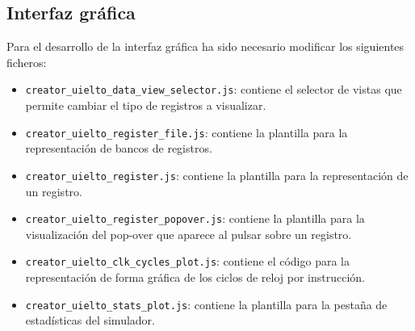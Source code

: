 
\subsection{Interfaz gráfica}\label{subsec:gui}

Para el desarrollo de la interfaz gráfica ha sido necesario modificar los siguientes ficheros:
\begin{itemize}
    \item \texttt{creator\_uielto\_data\_view\_selector.js}: contiene el selector de vistas que permite cambiar el tipo de registros a visualizar.
    \item \texttt{creator\_uielto\_register\_file.js}: contiene la plantilla para la representación de bancos de registros.
    \item \texttt{creator\_uielto\_register.js}: contiene la plantilla para la representación de un registro.
    \item \texttt{creator\_uielto\_register\_popover.js}: contiene la plantilla para la visualización del pop-over que aparece al pulsar sobre un registro.
    \item \texttt{creator\_uielto\_clk\_cycles\_plot.js}: contiene el código para la representación de forma gráfica de los ciclos de reloj por instrucción.
    \item \texttt{creator\_uielto\_stats\_plot.js}: contiene la plantilla para la pestaña de estadísticas del simulador.
\end{itemize}


